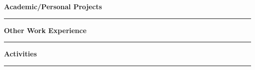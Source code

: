 \documentclass{article}
\begin{document}
\noindent\large{\textbf{Academic/Personal Projects}}\\[-0.6em]
\noindent\rule{\textwidth}{0.4pt}
\begin{normalsize}
    
\end{normalsize}
\vspace{0.7em}
\newpage


\noindent\large{\textbf{Other Work Experience}}\\[-0.6em]
\noindent\rule{\textwidth}{0.4pt}
\begin{normalsize}
    
\end{normalsize}
\vspace{0.7em}


\noindent\large{\textbf{Activities}}\\[-0.6em]
\noindent\rule{\textwidth}{0.4pt}
\begin{normalsize}
    
\end{normalsize}
\vspace{0.7em}
\end{document}
